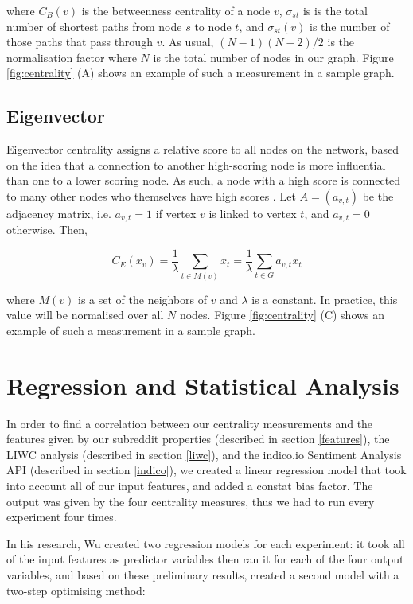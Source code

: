 \documentclass[bsc,frontabs,twoside,singlespacing,parskip,deptreport]{infthesis}
\begin{document}
where $C_B(v)$ is the betweenness centrality of a node $v$, $\sigma_{st}$ is is the total number of shortest paths from node $s$ to node $t$, and $\sigma_{st}(v)$ is the number of those paths that pass through $v$. As usual, $(N-1)(N-2)/2$ is the normalisation factor where $N$ is the total number of nodes in our graph. Figure \ref{fig:centrality} (A) shows an example of such a measurement in a sample graph.

\subsection{Eigenvector}

Eigenvector centrality assigns a relative score to all nodes on the network, based on the idea that a connection to another high-scoring node is more influential than one to a lower scoring node. As such, a node with a high score is connected to many other nodes who themselves have high scores \cite{LangvilleAmyN2006Gpab}. Let $A = (a_{v,t})$ be the adjacency matrix, i.e. $a_{v,t} = 1$ if vertex $v$ is linked to vertex $t$, and $a_{v,t}=0$ otherwise. Then, 

\begin{equation}
	C_E(x_v) = \frac{1}{\lambda} \sum_{t \in M(v)}x_t = \frac{1}{\lambda} \sum_{t \in G} a_{v,t}x_t
\end{equation}

where $M(v)$ is a set of the neighbors of $v$ and $\lambda$ is a constant. In practice, this value will be normalised over all $N$ nodes. Figure \ref{fig:centrality} (C) shows an example of such a measurement in a sample graph.

\section{Regression and Statistical Analysis}\label{regression-and-stats}

In order to find a correlation between our centrality measurements and the features given by our subreddit properties (described in section \ref{features}), the LIWC analysis (described in section \ref{liwc}), and the indico.io Sentiment Analysis API (described in section \ref{indico}), we created a linear regression model that took into account all of our input features, and added a constat bias factor. The output was given by the four centrality measures, thus we had to run every experiment four times.

In his research, Wu \cite{masters} created two regression models for each experiment: it took all of the input features as predictor variables then ran it for each of the four output variables, and based on these preliminary results, created a second model with a two-step optimising method:
\end{document}
